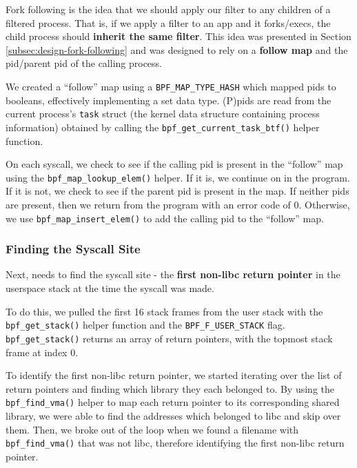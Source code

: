 Fork following is the idea that we should apply our filter to any children of a
filtered process. That is, if we apply a filter to an app and it forks/execs,
the child process should \textbf{inherit the same filter}. This idea was
presented in Section \ref{subsec:design-fork-following} and was designed to rely
on a \textbf{follow map} and the \ac{pid}/parent \ac{pid} of the calling
process.

We created a ``follow'' map using a \texttt{BPF\_MAP\_TYPE\_HASH} which mapped
\ac{pid}s to booleans, effectively implementing a set data type. (P)\acp{pid}
are read from the current process's \texttt{task} struct (the kernel data
structure containing process information) obtained by calling the
\texttt{bpf\_get\_current\_task\_btf()} helper function. 

On each syscall, we check to see if the calling \ac{pid} is present in the
``follow'' map using the \texttt{bpf\_map\_lookup\_elem()} helper. If it is, we continue 
on in the program. If it is not, we check to see if the parent \ac{pid} is
present in the map. If neither \acp{pid} are present, then we return from the
program with an error code of 0. Otherwise, we use
\texttt{bpf\_map\_insert\_elem()} to add the calling \ac{pid} to the 
``follow'' map.

\subsubsection{Finding the Syscall Site}\label{subsec:impl-syscall-site}

Next, \af needs to find the syscall site - the \textbf{first non-\ac{libc} return pointer} in the userspace stack at the time the syscall was made.

To do this, we pulled the first 16 stack frames from the user stack with the 
\texttt{bpf\_get\_stack()} helper function and the \texttt{BPF\_F\_USER\_STACK}
flag. \texttt{bpf\_get\_stack()} returns an array of return pointers, with the
topmost stack frame at index 0. 

To identify the first non-\ac{libc} return pointer, we started iterating over
the list of return pointers and finding which library they each belonged to.
By using the \texttt{bpf\_find\_vma()} helper to map each return pointer to its
corresponding shared library, we were able to find the addresses which belonged
to \ac{libc} and skip over them. Then, we broke out of the loop when we found a
filename with \texttt{bpf\_find\_vma()} that was not \ac{libc}, therefore
identifying the first non-\ac{libc} return pointer.

